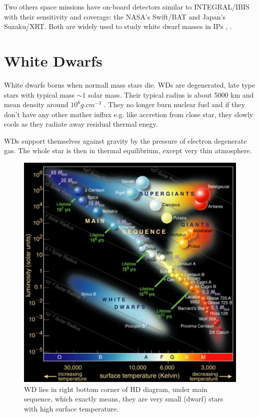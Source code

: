 \documentclass[oneside,a4paper,11pt]{report}
\begin{document}
Two others space missions have on-board detectors similar to INTEGRAL/IBIS with their sensitivity 
and coverage: the NASA's Swift/BAT and Japan's Suzaku/XRT. Both are widely used to study white dwarf 
masses in IPs \citet{2009A&A...496..121B}, \citet{2010A&A...520A..25Y}.    



\chapter{White Dwarfs}
White dwarfs borns when normall mass stars die. WDs are degenerated, late type stars with typical mass $\sim1$ solar mass. Their typical radius is about
 5000 km and mean density around $10^6 g.cm^{-3}$ \citet{2004bhwd.book.....S}. They no longer burn nuclear fuel and
if they don't have any other mather influx e.g. like accretion from close star, they slowly cools as they radiate
away residual thermal enegy.

WDs support themselves against gravity by the pressure of electron degenerate gas. The whole star is then in thermal 
equilibrium, except very thin atmosphere.  
 

\begin{figure}[!hbt]
\centering
\includegraphics[totalheight=10cm]{hrdiagram}
\caption{WD lies in right bottom corner of HD diagram, under main 
sequence, which exactly means, they are very small (dwarf) stars with high surface temperature.  }
\label{hrd1} 
\end{figure}
\end{document}
